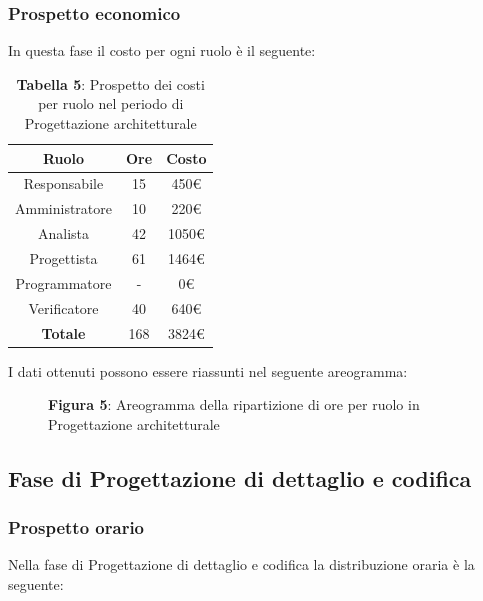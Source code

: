 \subsubsection{Prospetto economico}
In questa fase il costo per ogni ruolo è il seguente:

\begin{table}[H]
	\centering
	\renewcommand{\arraystretch}{1.5}
	\begin{tabular}{|c|c|c|}
		\hline
		\rowcolor{lighter-grayer}
Ruolo & Ore & Costo \\ \hline
Responsabile & 15 & 450\euro \\ \hline
Amministratore & 10 & 220\euro \\ \hline
Analista & 42 & 1050\euro \\ \hline
Progettista & 61 & 1464\euro \\ \hline
Programmatore & - & 0\euro \\ \hline
Verificatore & 40 & 640\euro \\ \hline
\textbf{Totale} & 168 & 3824\euro \\ \hline
	\end{tabular}
	\caption*{\textbf{Tabella 5}: Prospetto dei costi per ruolo nel periodo di Progettazione architetturale\\}
\end{table}

I dati ottenuti possono essere riassunti nel seguente areogramma:


\begin{figure}[H]
	\centering
	\caption*{\textbf{Figura 5}: Areogramma della ripartizione di ore per ruolo in Progettazione architetturale}
	\label{fig:Figura10}
\end{figure}



\subsection{Fase di Progettazione di dettaglio e codifica}
\subsubsection{Prospetto orario}
Nella fase di Progettazione di dettaglio e codifica la distribuzione oraria è la seguente:

